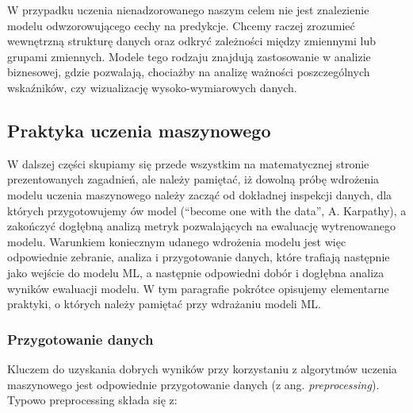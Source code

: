 \documentclass{myclass}
\numberwithin{equation}{subsection}
\begin{document}
W przypadku uczenia nienadzorowanego naszym celem nie jest znalezienie modelu odwzorowującego cechy
na predykcje. Chcemy raczej zrozumieć wewnętrzną strukturę danych oraz odkryć zależności między
zmiennymi lub grupami zmiennych. Modele tego rodzaju znajdują zastosowanie w analizie biznesowej,
gdzie pozwalają, chociażby na analizę ważności poszczególnych wskaźników, czy wizualizację
wysoko-wymiarowych danych.


\subsection{Praktyka uczenia maszynowego}

W dalszej części skupiamy się przede wszystkim na matematycznej stronie prezentowanych zagadnień,
ale należy pamiętać, iż dowolną próbę wdrożenia modelu uczenia maszynowego należy zacząć od
dokładnej inspekcji danych, dla których przygotowujemy ów model (\enquote{become one with the data},
A. Karpathy), a zakończyć dogłębną analizą metryk pozwalających na ewaluację wytrenowanego modelu.
Warunkiem koniecznym udanego wdrożenia modelu jest więc odpowiednie zebranie, analiza i
przygotowanie danych, które trafiają następnie jako wejście do modelu ML, a następnie odpowiedni
dobór i dogłębna analiza wyników ewaluacji modelu. W tym paragrafie pokrótce opisujemy elementarne
praktyki, o których należy pamiętać przy wdrażaniu modeli ML.

\subsubsection{Przygotowanie danych}

Kluczem do uzyskania dobrych wyników przy korzystaniu z algorytmów uczenia maszynowego jest
odpowiednie przygotowanie danych (z ang. \textit{preprocessing}). Typowo preprocessing składa się z:
\end{document}
